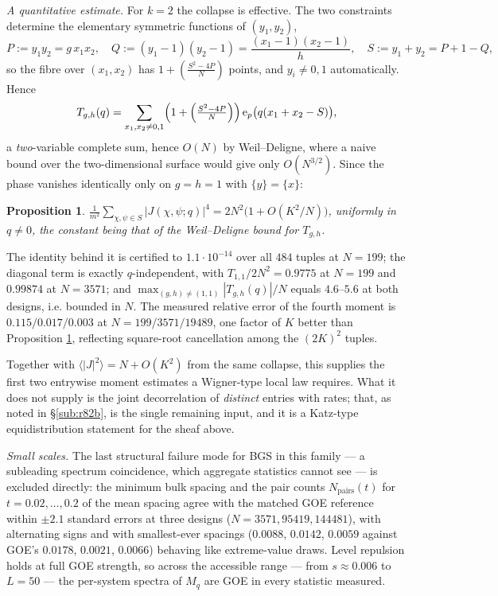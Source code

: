 \documentclass[11pt,reqno]{amsart}
\newtheorem{proposition}[theorem]{Proposition}
\theoremstyle{definition}
\newcommand{\ep}{\mathrm{e}_p}
\begin{document}
\emph{A quantitative estimate.}  For $k=2$ the collapse is effective.  The two
constraints determine the elementary symmetric functions of $(y_1,y_2)$,
\[
  P:=y_1y_2=g\,x_1x_2,\quad
  Q:=(y_1-1)(y_2-1)=\frac{(x_1-1)(x_2-1)}{h},\quad
  S:=y_1+y_2=P+1-Q,
\]
so the fibre over $(x_1,x_2)$ has $1+\left(\tfrac{S^2-4P}{N}\right)$ points, and
$y_i\neq0,1$ automatically.  Hence
\[
  T_{g,h}(q)=\sum_{x_1,x_2\neq0,1}
    \Bigl(1+\Bigl(\tfrac{S^2-4P}{N}\Bigr)\Bigr)\,\ep\bigl(q(x_1+x_2-S)\bigr),
\]
a \emph{two}-variable complete sum, hence $O(N)$ by Weil--Deligne, where a naive
bound over the two-dimensional surface would give only $O(N^{3/2})$.  Since the
phase vanishes identically only on $g=h=1$ with $\{y\}=\{x\}$:

\begin{proposition}\label{prop:fourth}
$\displaystyle \frac1{m^2}\sum_{\chi,\psi\in S}|J(\chi,\psi;q)|^4
 = 2N^2\bigl(1+O(K^2/N)\bigr)$,
uniformly in $q\neq0$, the constant being that of the Weil--Deligne bound for
$T_{g,h}$.
\end{proposition}

The identity behind it is certified to $1.1\cdot10^{-14}$ over all $484$ tuples
at $N=199$; the diagonal term is exactly $q$-independent, with
$T_{1,1}/2N^2=0.9775$ at $N=199$ and $0.99874$ at $N=3571$; and
$\max_{(g,h)\neq(1,1)}|T_{g,h}(q)|/N$ equals $4.6$--$5.6$ at both designs, i.e.
bounded in $N$.  The measured relative error of the fourth moment is
$0.115/0.017/0.003$ at $N=199/3571/19489$, one factor of $K$ better than
Proposition \ref{prop:fourth}, reflecting square-root cancellation among the
$(2K)^2$ tuples.

Together with $\langle|J|^2\rangle=N+O(K^2)$ from the same collapse, this
supplies the first two entrywise moment estimates a Wigner-type local law
requires.  What it does not supply is the joint decorrelation of \emph{distinct}
entries with rates; that, as noted in \S\ref{sub:r82b}, is the single remaining
input, and it is a Katz-type equidistribution statement for the sheaf above.


\emph{Small scales.}  The last structural failure mode for BGS in this family
--- a subleading spectrum coincidence, which aggregate statistics cannot see ---
is excluded directly: the minimum bulk spacing and the pair counts
$N_{\mathrm{pairs}}(t)$ for $t=0.02,\dots,0.2$ of the mean spacing agree with the
matched GOE reference within $\pm2.1$ standard errors at three designs
($N=3571, 95419, 144481$), with alternating signs and with smallest-ever
spacings ($0.0088$, $0.0142$, $0.0059$ against GOE's $0.0178$, $0.0021$,
$0.0066$) behaving like extreme-value draws.  Level repulsion holds at full GOE
strength, so across the accessible range --- from $s\approx0.006$ to $L=50$ ---
the per-system spectra of $M_q$ are GOE in every statistic measured.
\end{document}
